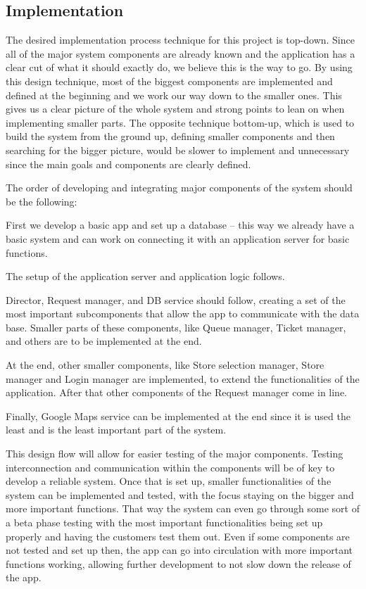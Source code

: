 \newpage

\subsection{Implementation}
The desired implementation process technique for this project is top-down. Since all of the major system components are already known and the application has a clear cut of what it should exactly do, we believe this is the way to go. By using this design technique, most of the biggest components are implemented and defined at the beginning and we work our way down to the smaller ones. This gives us a clear picture of the whole system and strong points to lean on when implementing smaller parts. The opposite technique bottom-up, which is used to build the system from the ground up, defining smaller components and then searching for the bigger picture, would be slower to implement and unnecessary since the main goals and components are clearly defined. \newline

The order of developing and integrating major components of the system should be the following:

First we develop a basic app and set up a database – this way we already have a basic system and can work on connecting it with an application server for basic functions. 

The setup of the application server and application logic follows. 

Director, Request manager, and DB service should follow, creating a set of the most important subcomponents that allow the app to communicate with the data base. Smaller parts of these components, like Queue manager, Ticket manager, and others are to be implemented at the end. 

At the end, other smaller components, like Store selection manager, Store manager and Login manager are implemented, to extend the functionalities of the application. After that other components of the Request manager come in line. 

Finally, Google Maps service can be implemented at the end since it is used the least and is the least important part of the system.  \newline

 

This design flow will allow for easier testing of the major components. Testing interconnection and communication within the components will be of key to develop a reliable system. Once that is set up, smaller functionalities of the system can be implemented and tested, with the focus staying on the bigger and more important functions. That way the system can even go through some sort of a beta phase testing with the most important functionalities being set up properly and having the customers test them out. Even if some components are not tested and set up then, the app can go into circulation with more important functions working, allowing further development to not slow down the release of the app. \newpage

